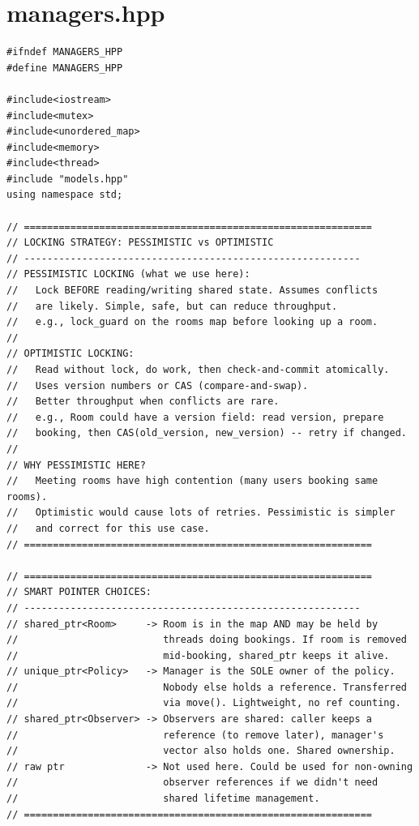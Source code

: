 \documentclass[11pt,a4paper]{article}
\begin{document}
\newpage
\section{managers.hpp}
\begin{lstlisting}[title={\texttt{managers.hpp}}]
#ifndef MANAGERS_HPP
#define MANAGERS_HPP

#include<iostream>
#include<mutex>
#include<unordered_map>
#include<memory>
#include<thread>
#include "models.hpp"
using namespace std;

// ============================================================
// LOCKING STRATEGY: PESSIMISTIC vs OPTIMISTIC
// ----------------------------------------------------------
// PESSIMISTIC LOCKING (what we use here):
//   Lock BEFORE reading/writing shared state. Assumes conflicts
//   are likely. Simple, safe, but can reduce throughput.
//   e.g., lock_guard on the rooms map before looking up a room.
//
// OPTIMISTIC LOCKING:
//   Read without lock, do work, then check-and-commit atomically.
//   Uses version numbers or CAS (compare-and-swap).
//   Better throughput when conflicts are rare.
//   e.g., Room could have a version field: read version, prepare
//   booking, then CAS(old_version, new_version) -- retry if changed.
//
// WHY PESSIMISTIC HERE?
//   Meeting rooms have high contention (many users booking same rooms).
//   Optimistic would cause lots of retries. Pessimistic is simpler
//   and correct for this use case.
// ============================================================

// ============================================================
// SMART POINTER CHOICES:
// ----------------------------------------------------------
// shared_ptr<Room>     -> Room is in the map AND may be held by
//                         threads doing bookings. If room is removed
//                         mid-booking, shared_ptr keeps it alive.
// unique_ptr<Policy>   -> Manager is the SOLE owner of the policy.
//                         Nobody else holds a reference. Transferred
//                         via move(). Lightweight, no ref counting.
// shared_ptr<Observer> -> Observers are shared: caller keeps a
//                         reference (to remove later), manager's
//                         vector also holds one. Shared ownership.
// raw ptr              -> Not used here. Could be used for non-owning
//                         observer references if we didn't need
//                         shared lifetime management.
// ============================================================


\end{lstlisting}
\end{document}
